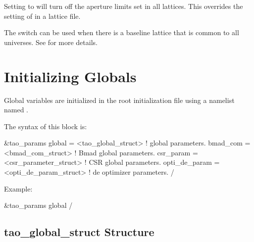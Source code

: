 {{{{{{{{Setting  to  will turn off the
aperture limits set in all lattices. This overrides the setting of
 in a lattice file.

The  switch can be used when there is a baseline
lattice that is common to all universes. See  for more
details.

\section{Initializing Globals}
\label{s:globals} 

Global variables are initialized in the root initialization file using a 
namelist named .

The syntax of this block is:
\begin{example}
  &tao_params
    global        = <tao_global_struct>     ! global parameters. 
    bmad_com      = <bmad_com_struct>       ! Bmad global parameters. 
    csr_param     = <csr_parameter_struct>  ! CSR global parameters. 
    opti_de_param = <opti_de_param_struct>  ! de optimizer parameters. 
  /
\end{example}
Example:
\begin{example}
  &tao_params
    global%
  /
\end{example}

\subsection{tao\_global\_struct Structure}
\label{s:tao.global.struct} 

}}}}}}}}
